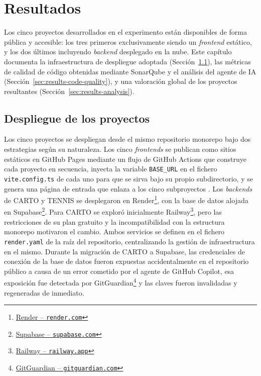 
\chapter{Resultados} \label{chap:Results}

Los cinco proyectos desarrollados en el experimento están disponibles \cite{URL::TFG-Web} de forma pública y accesible: los tres primeros exclusivamente siendo un \textit{frontend} estático, y los dos últimos incluyendo \textit{backend} desplegado en la nube. Este capítulo documenta la infraestructura de despliegue adoptada (Sección~\ref{sec:results-deployment}), las métricas de calidad de código obtenidas mediante SonarQube y el análisis del agente de \ac{IA} (Sección~\ref{sec:results-code-quality}), y una valoración global de los proyectos resultantes (Sección~\ref{sec:results-analysis}).

\section{Despliegue de los proyectos} \label{sec:results-deployment}

Los cinco proyectos se despliegan desde el mismo repositorio monorepo bajo dos estrategias según su naturaleza. Los cinco \textit{frontends} se publican como sitios estáticos en GitHub Pages mediante un flujo de GitHub Actions que construye cada proyecto en secuencia, inyecta la variable \texttt{BASE\_URL} en el fichero \texttt{vite.config.ts} de cada uno para que se sirva bajo su propio subdirectorio, y se genera una página de entrada que enlaza a los cinco subproyectos \cite{URL::TFG-Web}. Los \textit{backends} de \ac{CARTO} y \ac{TENNIS} se desplegaron en Render\footnote{\href{https://render.com}{Render -- \texttt{render.com}}}, con la base de datos alojada en Supabase\footnote{\href{https://supabase.com}{Supabase -- \texttt{supabase.com}}}. Para \ac{CARTO} se exploró inicialmente Railway\footnote{\href{https://railway.app}{Railway -- \texttt{railway.app}}}, pero las restricciones de su plan gratuito y la incompatibilidad con la estructura monorepo motivaron el cambio. Ambos servicios se definen en el fichero \texttt{render.yaml} de la raíz del repositorio, centralizando la gestión de infraestructura en el mismo. 
Durante la migración de \ac{CARTO} a Supabase, las credenciales de conexión de la base de datos fueron expuestas accidentalmente en el repositorio público a causa de un error cometido por el agente de GitHub Copilot, esa exposición fue detectada por GitGuardian\footnote{\href{https://www.gitguardian.com}{GitGuardian -- \texttt{gitguardian.com}}} y las claves fueron invalidadas y regeneradas de inmediato.

